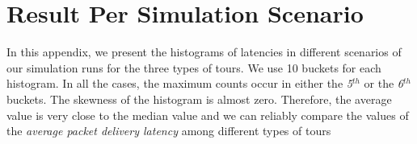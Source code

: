 \appendix
\chapter{Result Per Simulation Scenario}
\captionsetup[figure]{list=no}
\captionsetup[subfloat]{list=no}
\newcommand{\histobarScale}{0.33}
\newcommand{\overlappedTour}{0.22}
\newcommand{\excltour}{0.085}
\newcommand{\txr}{2.00} 
\newcommand{\ovFile}{n101r2-00}
\newcommand{\trOnly}{2}
In this appendix, we present the histograms of latencies in different scenarios of our simulation
runs for the three types of tours. We use 10 buckets for each histogram. In all the cases, the
maximum counts occur in either the \textit{5}$^{th}$ or the \textit{6}$^{th}$ buckets. The
skewness of the histogram is almost zero. Therefore, the average value is very close to 
the median value and we can reliably compare the values of the \textit{average packet delivery
latency} among different types of tours 
\clearpage
\renewcommand{\txr}{2.00} 
\renewcommand{\ovFile}{n101r2-00}
\renewcommand{\trOnly}{2}

\clearpage
\renewcommand{\txr}{8.00} 
\renewcommand{\ovFile}{n101r8-00}
\renewcommand{\trOnly}{8}

\clearpage
\renewcommand{\txr}{14.00} 
\renewcommand{\ovFile}{n101r14-00}
\renewcommand{\trOnly}{14}

\clearpage
\renewcommand{\txr}{22.00} 
\renewcommand{\ovFile}{n101r22-00}
\renewcommand{\trOnly}{22}

\clearpage
\renewcommand{\txr}{30.00} 
\renewcommand{\ovFile}{n101r30-00}
\renewcommand{\trOnly}{30}

\clearpage
